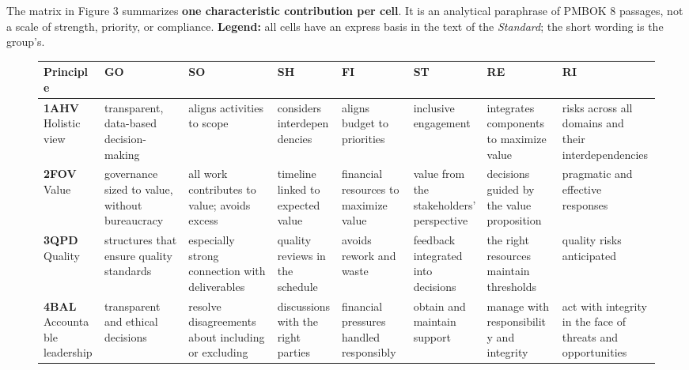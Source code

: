 \documentclass[11pt,a4paper]{article}
\newcommand{\SingleSpacing}{}
\begin{document}
The matrix in Figure 3 summarizes \textbf{one characteristic contribution per cell}. It is an analytical paraphrase of PMBOK 8 passages, not a scale of strength, priority, or compliance. \textbf{Legend:} all cells have an express basis in the text of the \textit{Standard}; the short wording is the group's.

\begin{figure}[!htbp]
\centering

\begingroup\SingleSpacing\scriptsize
\begin{tabular}{@{}>{\raggedright\arraybackslash}p{}>{\raggedright\arraybackslash}p{}>{\raggedright\arraybackslash}p{}>{\raggedright\arraybackslash}p{}>{\raggedright\arraybackslash}p{}>{\raggedright\arraybackslash}p{}>{\raggedright\arraybackslash}p{}>{\raggedright\arraybackslash}p{}@{}}
\midrule
\textbf{Principle} & \textbf{GO} & \textbf{SO} & \textbf{SH} & \textbf{FI} & \textbf{ST} & \textbf{RE} & \textbf{RI}\\
\midrule
\rowcolor{bandaProativa}\textbf{1AHV} Holistic view & transparent, data-based decision-making & aligns activities to scope & considers interdependencies & aligns budget to priorities & inclusive engagement & integrates components to maximize value & risks across all domains and their interdependencies\\
\rowcolor{bandaValor}\textbf{2FOV} Value & governance sized to value, without bureaucracy & all work contributes to value; avoids excess & timeline linked to expected value & financial resources to maximize value & value from the stakeholders' perspective & decisions guided by the value proposition & pragmatic and effective responses\\
\rowcolor{bandaProativa}\textbf{3QPD} Quality & structures that ensure quality standards & especially strong connection with deliverables & quality reviews in the schedule & avoids rework and waste & feedback integrated into decisions & the right resources maintain thresholds & quality risks anticipated\\
\rowcolor{bandaResp}\textbf{4BAL} Accountable leadership & transparent and ethical decisions & resolve disagreements about including or excluding & discussions with the right parties & financial pressures handled responsibly & obtain and maintain support & manage with responsibility and integrity & act with integrity in the face of threats and opportunities\\

\end{tabular}
\end{figure}
\end{document}
